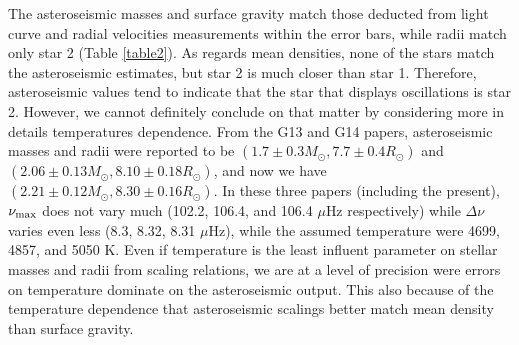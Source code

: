


The asteroseismic masses and surface gravity match those deducted from light curve and radial velocities measurements within the error bars, while radii match only star 2 (Table \ref{table2}). As regards mean densities, none of the stars match the asteroseismic estimates, but star 2 is much closer than star 1. Therefore, asteroseismic values tend to indicate that the star that displays oscillations is star 2. However, we cannot definitely conclude on that matter by considering more in details temperatures dependence. From the G13 and G14 papers, asteroseismic masses and radii were reported to be $(1.7\pm0.3 M_\odot, 7.7\pm0.4 R_\odot)$ and $(2.06\pm0.13 M_\odot, 8.10\pm0.18 R_\odot)$, and now we have $(2.21\pm0.12 M_\odot, 8.30\pm0.16 R_\odot)$. In these three papers (including the present), $\nu_{\rm{max}}$ does not vary much (102.2, 106.4, and 106.4 $\mu$Hz respectively) while $\Delta\nu$ varies even less (8.3, 8.32, 8.31 $\mu$Hz), while the assumed temperature were 4699, 4857, and 5050 K. Even if temperature is the least influent parameter on stellar masses and radii from scaling relations, we are at a level of precision were errors on temperature dominate on the asteroseismic output. This also because of the temperature dependence that asteroseismic scalings better match mean density than surface gravity.




